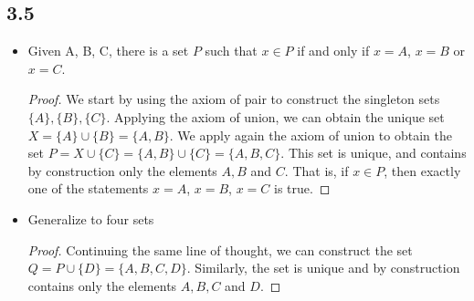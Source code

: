 \subsection*{3.5}

\begin{itemize}
    \item Given A, B, C, there is a set $P$ such that $x \in P$ if and only if $x = A$, $x = B$ or $x = C$.
    
    \begin{proof}
    We start by using the axiom of pair to construct the singleton sets $\{A\}, \{B\}, \{C\}$. Applying the axiom of union, we can obtain the unique set $X = \{A\} \cup \{B\} = \{A, B\}$. We apply again the axiom of union to obtain the set $P = X \cup \{C\} = \{A, B\} \cup \{C\} = \{A, B, C\}$. This set is unique, and contains by construction only the elements $A, B$ and $C$. That is, if $x \in P$, then exactly one of the statements $x = A$, $x = B$, $x = C$ is true.
    
    \end{proof}
    
    \item Generalize to four sets
    \begin{proof}
    Continuing the same line of thought, we can construct the set $Q = P \cup \{D\} = \{A, B, C, D\}$. Similarly, the set is unique and by construction contains only the elements $A, B, C$ and $D$.
    \end{proof}
\end{itemize}

